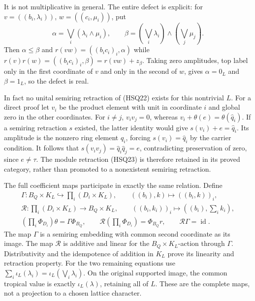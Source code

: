 It is not multiplicative in general. The entire defect is explicit:
for $v=((b_i,\lambda_i))$, $w=((c_i,\mu_i))$, put
\begin{equation}\tag{HSQ24}
 \alpha=\bigvee_i(\lambda_i\wedge\mu_i),\qquad
 \beta=(\bigvee_i\lambda_i)\wedge(\bigvee_j\mu_j).
\end{equation}
Then $\alpha\le\beta$ and
$r(vw)=((b_ic_i)_i,\alpha)$ while
$r(v)r(w)=((b_ic_i)_i,\beta)=r(vw)+z_\beta$.
Taking zero amplitudes, top label only in the first coordinate
of $v$ and only in the second of $w$, gives $\alpha=0_L$ and
$\beta=1_L$, so the defect is real.

In fact no unital semiring retraction of (HSQ22) exists for this
nontrivial $L$. For a direct proof let $v_i$ be the product element
with unit in coordinate $i$ and global zero in the other coordinates.
For $i\ne j$, $v_iv_j=0$, whereas
$v_i+\theta(e)=\theta(\widehat q_i)$. If a semiring retraction
$s$ existed, the latter identity would give
$s(v_i)+e=\widehat q_i$. Its amplitude is the nonzero ring
element $q_i$, forcing $s(v_i)=\widehat q_i$ by the carrier
condition. It follows that $s(v_iv_j)=\widehat q_i\widehat q_j=e$,
contradicting preservation of zero, since $e\ne\tau$. The
module retraction (HSQ23) is therefore retained in its proved
category, rather than promoted to a nonexistent semiring retraction.

The full coefficient maps participate in exactly the same relation.
Define
\begin{equation}\tag{HSQ25}
 \begin{gathered}
 \Gamma:B_Q\times K_L\hookrightarrow\prod_i(D_i\times K_L),
 \qquad((b_i),k)\longmapsto((b_i,k))_i,\\
 \mathcal R:\prod_i(D_i\times K_L)\longrightarrow B_Q\times K_L,
 \qquad((b_i,k_i))_i\longmapsto((b_i),\sum_i k_i),\\
 (\prod_i\Phi_{D_i})\theta=\Gamma\Phi_{B_Q},\qquad
 \mathcal R(\prod_i\Phi_{D_i})=\Phi_{B_Q}r,
 \qquad\mathcal R\Gamma=\operatorname{id}.
 \end{gathered}
\end{equation}
The map $\Gamma$ is a semiring embedding with common second
coordinate as its image. The map $\mathcal R$ is additive and
linear for the $B_Q\times K_L$-action through $\Gamma$.
Distributivity and the idempotence of addition in $K_L$ prove its
linearity and retraction property. For the two remaining equations
use $\sum_i\iota_L(\lambda_i)=\iota_L(\bigvee_i\lambda_i)$.
On the original supported image, the common tropical value is
exactly $\iota_L(\lambda)$, retaining all of $L$. These are the
complete maps, not a projection to a chosen lattice character.

